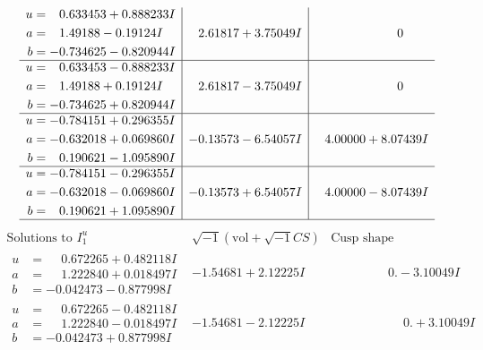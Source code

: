 \documentclass[1p]{elsarticle_modified}
\theoremstyle{definition}
\newcommand{\I}{\sqrt{-1}}
\begin{document}
$$\begin{array}{c|c|c}
\begin{aligned}
u &= \phantom{-}0.633453 + 0.888233 I \\
a &= \phantom{-}1.49188 - 0.19124 I \\
b &= -0.734625 - 0.820944 I\end{aligned}
 & \phantom{-}2.61817 + 3.75049 I & \phantom{-0.000000 } 0 \\ \hline\begin{aligned}
u &= \phantom{-}0.633453 - 0.888233 I \\
a &= \phantom{-}1.49188 + 0.19124 I \\
b &= -0.734625 + 0.820944 I\end{aligned}
 & \phantom{-}2.61817 - 3.75049 I & \phantom{-0.000000 } 0 \\ \hline\begin{aligned}
u &= -0.784151 + 0.296355 I \\
a &= -0.632018 + 0.069860 I \\
b &= \phantom{-}0.190621 - 1.095890 I\end{aligned}
 & -0.13573 - 6.54057 I & \phantom{-}4.00000 + 8.07439 I \\ \hline\begin{aligned}
u &= -0.784151 - 0.296355 I \\
a &= -0.632018 - 0.069860 I \\
b &= \phantom{-}0.190621 + 1.095890 I\end{aligned}
 & -0.13573 + 6.54057 I & \phantom{-}4.00000 - 8.07439 I\\
 \hline 
 \end{array}$$\newpage$$\begin{array}{c|c|c}  
\text{Solutions to }I^u_{1}& \I (\text{vol} + \sqrt{-1}CS) & \text{Cusp shape}\\
 \hline 
\begin{aligned}
u &= \phantom{-}0.672265 + 0.482118 I \\
a &= \phantom{-}1.222840 + 0.018497 I \\
b &= -0.042473 - 0.877998 I\end{aligned}
 & -1.54681 + 2.12225 I & \phantom{-0.000000 } 0. - 3.10049 I \\ \hline\begin{aligned}
u &= \phantom{-}0.672265 - 0.482118 I \\
a &= \phantom{-}1.222840 - 0.018497 I \\
b &= -0.042473 + 0.877998 I\end{aligned}
 & -1.54681 - 2.12225 I & \phantom{-0.000000 -}0. + 3.10049 I \\ \hline\begin{aligned}

\end{aligned}
\end{array}$$
\end{document}
